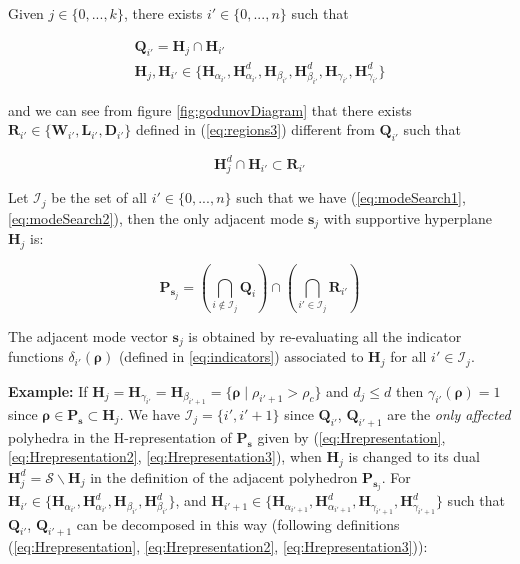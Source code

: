 \documentclass[11pt]{article}
\numberwithin{equation}{section}
\numberwithin{figure}{section}
\numberwithin{table}{section}
\begin{document}
Given $j\in\{0,...,k\}$, there exists $i'\in\{0,...,n\}$ such that

\begin{equation}
\begin{array}{l}
\textbf{Q}_{i'}=\textbf{H}_{j}\cap \textbf{H}_{i'}\\
\textbf{H}_{j}, \textbf{H}_{i'}\in \{\textbf{H}_{\alpha_{i'}}, \textbf{H}^{d}_{\alpha_{i'}}, \textbf{H}_{\beta_{i'}}, \textbf{H}^{d}_{\beta_{i'}}, \textbf{H}_{\gamma_{i'}}, \textbf{H}^{d}_{\gamma_{i'}}\}
\end{array}
\label{eq:modeSearch1}
\end{equation}

\noindent and we can see from figure \ref{fig:godunovDiagram} that there exists $\textbf{R}_{i'} \in \{\textbf{W}_{i'}, \textbf{L}_{i'}, \textbf{D}_{i'}\}$ defined in (\ref{eq:regions3}) different from $\textbf{Q}_{i'}$ such that

\begin{equation}
\textbf{H}^{d}_{j}\cap \textbf{H}_{i'}\subset \textbf{R}_{i'}
\label{eq:modeSearch2}
\end{equation}

\noindent Let $\mathcal{I}_{j}$ be the set of all $i'\in\{0,...,n\}$ such that we have (\ref{eq:modeSearch1}, \ref{eq:modeSearch2}), then the only adjacent mode $\boldsymbol s_{j}$ with supportive hyperplane $\textbf{H}_{j}$ is: 

\begin{equation}
\textbf{P}_{\boldsymbol s_{j}}=(\bigcap_{i\notin \mathcal{I}_{j}} \textbf{Q}_{i})\cap (\bigcap_{i'\in\mathcal{I}_{j}}\textbf{R}_{i'})
\label{eq:modeSearch3}
\end{equation}

\noindent The adjacent mode vector $\boldsymbol s_{j}$ is obtained by re-evaluating all the indicator functions $\delta_{i'}(\boldsymbol\rho)$ (defined in \ref{eq:indicators}) associated to $\textbf{H}_{j}$ for all $i'\in\mathcal{I}_{j}$.

\hspace{10mm}

\noindent\textbf{Example: }If $\textbf{H}_{j}=\textbf{H}_{\gamma_{i'}}=\textbf{H}_{\beta_{i'+1}}=\{\boldsymbol\rho\mid\rho_{i'+1}>\rho_{c}\}$ and $d_{j}\leq d$ then $\gamma_{i'}(\boldsymbol \rho)=1$ since $\boldsymbol\rho\in\textbf{P}_{\boldsymbol s}\subset\textbf{H}_{j}$. We have $\mathcal{I}_{j}=\{i',i'+1\}$ since $\textbf{Q}_{i'}$, $\textbf{Q}_{i'+1}$ are the \textit{only affected} polyhedra in the H-representation of $\textbf{P}_{\boldsymbol s}$ given by (\ref{eq:Hrepresentation}, \ref{eq:Hrepresentation2}, \ref{eq:Hrepresentation3}), when $\textbf{H}_{j}$ is changed to its dual $\textbf{H}^{d}_{j}=\mathcal{S}\backslash \textbf{H}_{j}$ in the definition of the adjacent polyhedron $\textbf{P}_{\boldsymbol s_{j}}$. For $\textbf{H}_{i'}\in\{\textbf{H}_{\alpha_{i'}}, \textbf{H}^{d}_{\alpha_{i'}}, \textbf{H}_{\beta_{i'}}, \textbf{H}^{d}_{\beta_{i'}}\}$, and $\textbf{H}_{i'+1}\in\{\textbf{H}_{\alpha_{i'+1}}, \textbf{H}^{d}_{\alpha_{i'+1}}, \textbf{H}_{\gamma_{i'+1}}, \textbf{H}^{d}_{\gamma_{i'+1}}\}$ such that $\textbf{Q}_{i'}$, $\textbf{Q}_{i'+1}$ can be decomposed in this way (following definitions (\ref{eq:Hrepresentation}, \ref{eq:Hrepresentation2}, \ref{eq:Hrepresentation3})):
\end{document}
